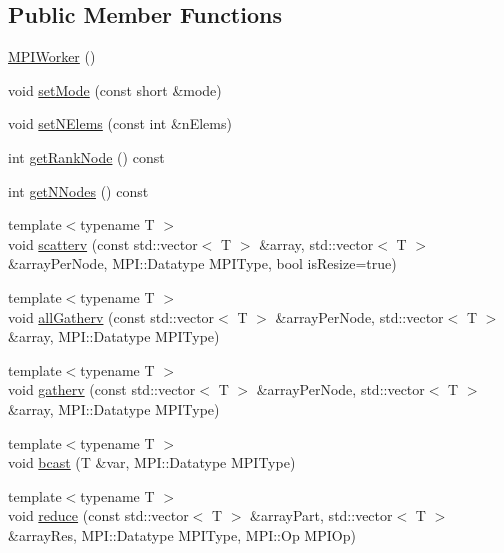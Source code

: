 \subsection*{Public Member Functions}
\begin{DoxyCompactItemize}
\item 
\hyperlink{classmpiworker_1_1MPIWorker_a4c6b9d1a46edd8a52cf750974975cbea}{M\-P\-I\-Worker} ()
\item 
void \hyperlink{classmpiworker_1_1MPIWorker_a2ff88f266efae23ec2a12a56bd0472d1}{set\-Mode} (const short \&mode)
\item 
void \hyperlink{classmpiworker_1_1MPIWorker_afcce321227c6d15a5fc2145cf59cd54d}{set\-N\-Elems} (const int \&n\-Elems)
\item 
int \hyperlink{classmpiworker_1_1MPIWorker_acbd3bd07d15ffa90a2c112edeecee6e0}{get\-Rank\-Node} () const 
\item 
int \hyperlink{classmpiworker_1_1MPIWorker_aeeb08c56600799093b3b9da60d337896}{get\-N\-Nodes} () const 
\item 
{\footnotesize template$<$typename T $>$ }\\void \hyperlink{classmpiworker_1_1MPIWorker_a24f713941043ab8d54574830a251995b}{scatterv} (const std\-::vector$<$ T $>$ \&array, std\-::vector$<$ T $>$ \&array\-Per\-Node, M\-P\-I\-::\-Datatype M\-P\-I\-Type, bool is\-Resize=true)
\item 
{\footnotesize template$<$typename T $>$ }\\void \hyperlink{classmpiworker_1_1MPIWorker_a49fda2aa379265e74f9b7504ad67ee9a}{all\-Gatherv} (const std\-::vector$<$ T $>$ \&array\-Per\-Node, std\-::vector$<$ T $>$ \&array, M\-P\-I\-::\-Datatype M\-P\-I\-Type)
\item 
{\footnotesize template$<$typename T $>$ }\\void \hyperlink{classmpiworker_1_1MPIWorker_aff6b4d55cb55caa37c9a0cb08b3c5661}{gatherv} (const std\-::vector$<$ T $>$ \&array\-Per\-Node, std\-::vector$<$ T $>$ \&array, M\-P\-I\-::\-Datatype M\-P\-I\-Type)
\item 
{\footnotesize template$<$typename T $>$ }\\void \hyperlink{classmpiworker_1_1MPIWorker_ae22bafa8bd4d6515e5b91ef95518c87d}{bcast} (T \&var, M\-P\-I\-::\-Datatype M\-P\-I\-Type)
\item 
{\footnotesize template$<$typename T $>$ }\\void \hyperlink{classmpiworker_1_1MPIWorker_a813f812267563ac5000fdee9393ddfff}{reduce} (const std\-::vector$<$ T $>$ \&array\-Part, std\-::vector$<$ T $>$ \&array\-Res, M\-P\-I\-::\-Datatype M\-P\-I\-Type, M\-P\-I\-::\-Op M\-P\-I\-Op)

\end{DoxyCompactItemize}
